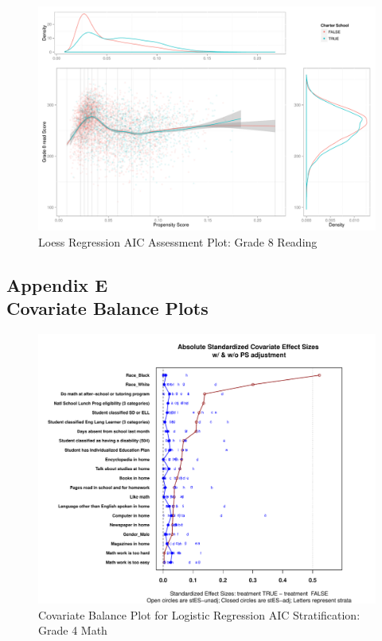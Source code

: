 \documentclass[letterpaper,12p,twoside]{article} %
\begin{document}
\begin{figure}[h!]
\begin{center}
\includegraphics[height=.4\textheight]{../Figures2009/g8read-loessAIC.pdf}
\caption{Loess Regression AIC Assessment Plot: Grade 8 Reading}
\label{fig:g8read:loess}
\end{center}
\end{figure}


\clearpage
{}
\subsection*{Appendix E\\Covariate Balance Plots}


\begin{figure}[h!]
\begin{center}
\includegraphics[width=\textwidth]{../Figures2009/g4math-lrAIC-balance.pdf}
\caption{Covariate Balance Plot for Logistic Regression AIC Stratification: Grade 4 Math}
\end{center}
\end{figure}
\end{document}
